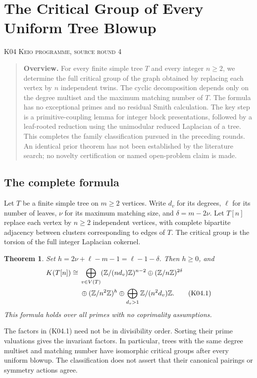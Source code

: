 \documentclass[11pt,a4paper]{article}
\newtheorem{theorem}{Theorem}[section]
\theoremstyle{definition}\newtheorem{definition}[theorem]{Definition}
\theoremstyle{remark}\newtheorem{remark}[theorem]{Remark}
\newcommand{\Z}{\mathbb Z}\newcommand{\Q}{\mathbb Q}\newcommand{\F}{\mathbb F}
\numberwithin{equation}{section}
\begin{document}
\clearpage
\section[K04 --- The Critical Group of Every Uniform Tree Blowup]{The Critical Group of Every Uniform Tree Blowup}\label{contrib-K04}
\noindent\textsc{K04 \quad Keio programme, source round 4}\par\medskip


\begin{quote}\small\textbf{Overview.} For every finite simple tree $T$ and every integer $n\geq2$, we determine the full critical group of the graph obtained by replacing each vertex by $n$ independent twins. The cyclic decomposition depends only on the degree multiset and the maximum matching number of $T$. The formula has no exceptional primes and no residual Smith calculation. The key step is a primitive-coupling lemma for integer block presentations, followed by a leaf-rooted reduction using the unimodular reduced Laplacian of a tree. This completes the family classification pursued in the preceding rounds. An identical prior theorem has not been established by the literature search; no novelty certification or named open-problem claim is made.\end{quote}

\subsection{The complete formula}\label{K04-sec-1}
Let $T$ be a finite simple tree on $m\geq2$ vertices. Write $d_v$ for its degrees, $\ell$ for its number of leaves, $\nu$ for its maximum matching size, and $\delta=m-2\nu$. Let $T[n]$ replace each vertex by $n\geq2$ independent vertices, with complete bipartite adjacency between clusters corresponding to edges of $T$. The critical group is the torsion of the full integer Laplacian cokernel.
\begin{theorem}\label{K04-main}
Set $h=2\nu+\ell-m-1=\ell-1-\delta$. Then $h\geq0$, and
\begin{align}
 K(T[n])\cong{}&\bigoplus_{v\in V(T)}(\Z/(nd_v)\Z)^{n-2}
 \oplus(\Z/n\Z)^{2\delta} \notag\\
 &\oplus(\Z/n^2\Z)^h
 \oplus\bigoplus_{d_v>1}\Z/(n^2d_v)\Z.                       \tag{K04.1}
\end{align}
This formula holds over all primes with no coprimality assumptions.
\end{theorem}
The factors in (K04.1) need not be in divisibility order. Sorting their prime valuations gives the invariant factors. In particular, trees with the same degree multiset and matching number have isomorphic critical groups after every uniform blowup. The classification does not assert that their canonical pairings or symmetry actions agree.
\end{document}
